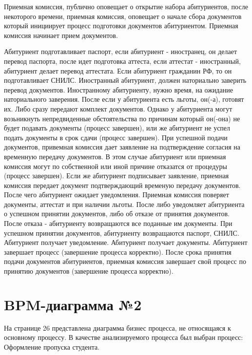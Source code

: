 \documentclass[areasetadvanced]{scrartcl}
\begin{document}
Приемная комиссия, публично оповещает о открытие набора абитуриентов, после некоторого времени, приемная комиссия, оповещает о начале сбора документов который инициирует процесс подготовки документов абитуриентом. Приемная комиссия начинает прием документов. 

Абитуриент подготавливает паспорт, если абитуриент - иностранец, он делает перевод паспорта, после идет подготовка аттеста, если аттестат - иностранный, абитуриент делает перевод аттестата. Если абитуриент гражданин РФ, то он подготавливает СНИЛС. Иностранный абитуриент, должен наториально заверить перевод документов. Иностранному абитуриенту, нужно время, на ожидание наториального заверения. После если у абитуриента есть льготы, он(-а), готовят их. Либо сразу передают комплект документов. Однако у абитуриента могут возьникнуть непредвиденные обстоятельства по причинам который он(-она) не будет подавать документы (процесс завершен), или же абитуриент не успел подать документы в срок сдачи (процесс завершен). При успешной подачи документов, привемная комиссия дает заявление на подтверждение согласия на временную передачу документов. В этом случае абитуриент или приемная комиссия могут по собственной или иной причине отказатся от процедуры (процесс завершен). Если же абитуриент подписывает заявление, приемная комиссия передает документ подтверждающий временую передачу документов. После чего абитуриент ожидает уведомления. 
Приемная комиссия поверяет документы, аттестат и при наличии льготы. После либо уведомляет абитуриента о успешном принятии документов, либо об отказе от принятия документов. После отказа - абитуриенту возвращаются все поданные им документы. При успешном принятии документов, абитуриенту возвращаются паспорт, СНИЛС. 
Абитуриент получает уведомление. Абитуриент получает документы. Абитуриент завершает процесс (завершение процесса корректно).
После срока принятия подачи документов абитуриентов, приемная комиссия завершает свой процесс по принятию документов (завершение процесса корректно).
    
\newpage
\section{BPM-диаграмма №2}
На странице 26 представлена диаграмма бизнес процесса, не относящаяся к основному процессу. 
В качестве анализируемого процесса был выбран процесс: Оформление пропуска студента.
\end{document}
